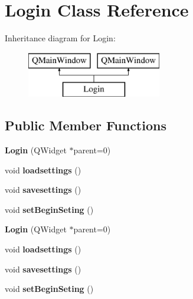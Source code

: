 \hypertarget{class_login}{}\section{Login Class Reference}
\label{class_login}
Inheritance diagram for Login\+:\begin{figure}[H]
\begin{center}
\leavevmode
\includegraphics[height=2.000000cm]{class_login}
\end{center}
\end{figure}
\subsection*{Public Member Functions}
\begin{DoxyCompactItemize}
\item 
\hypertarget{class_login_a021ebcfd29b2a30e3f5c5bbb36589381}{}\label{class_login_a021ebcfd29b2a30e3f5c5bbb36589381} 
{\bfseries Login} (Q\+Widget $\ast$parent=0)
\item 
\hypertarget{class_login_ad6a6b037140e8823d1b290cbcfeb2087}{}\label{class_login_ad6a6b037140e8823d1b290cbcfeb2087} 
void {\bfseries loadsettings} ()
\item 
\hypertarget{class_login_aac2415f9743fe56e19c5488fabf4aaba}{}\label{class_login_aac2415f9743fe56e19c5488fabf4aaba} 
void {\bfseries savesettings} ()
\item 
\hypertarget{class_login_a5060f9bd0638df8820f80ecde59c801f}{}\label{class_login_a5060f9bd0638df8820f80ecde59c801f} 
void {\bfseries set\+Begin\+Seting} ()
\item 
\hypertarget{class_login_a021ebcfd29b2a30e3f5c5bbb36589381}{}\label{class_login_a021ebcfd29b2a30e3f5c5bbb36589381} 
{\bfseries Login} (Q\+Widget $\ast$parent=0)
\item 
\hypertarget{class_login_ad6a6b037140e8823d1b290cbcfeb2087}{}\label{class_login_ad6a6b037140e8823d1b290cbcfeb2087} 
void {\bfseries loadsettings} ()
\item 
\hypertarget{class_login_aac2415f9743fe56e19c5488fabf4aaba}{}\label{class_login_aac2415f9743fe56e19c5488fabf4aaba} 
void {\bfseries savesettings} ()
\item 
\hypertarget{class_login_a5060f9bd0638df8820f80ecde59c801f}{}\label{class_login_a5060f9bd0638df8820f80ecde59c801f} 
void {\bfseries set\+Begin\+Seting} ()
\end{DoxyCompactItemize}
